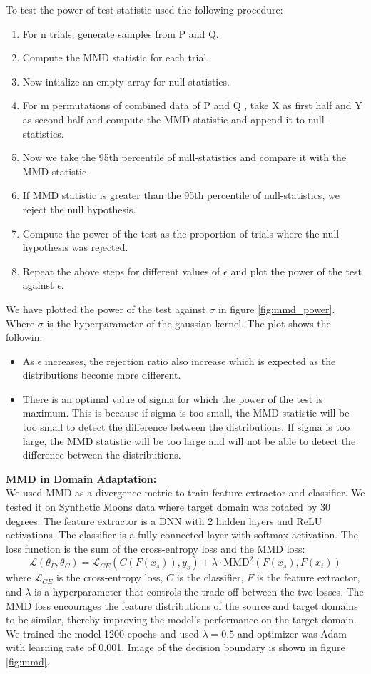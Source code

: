 \documentclass{article}
\begin{document}
To test the power of test statistic used the following procedure:
\begin{enumerate}
  \item For n trials, generate samples from P and Q.
  \item Compute the MMD statistic for each trial.
  \item Now intialize an empty array for null-statistics.
  \item For m permutations of combined data of P and Q , take X as first half and Y as second half and compute the MMD statistic and append it to null-statistics.
  \item Now we take the 95th percentile of null-statistics and compare it with the MMD statistic.
  \item If MMD statistic is greater than the 95th percentile of null-statistics, we reject the null hypothesis.
  \item Compute the power of the test as the proportion of trials where the null hypothesis was rejected.
  \item Repeat the above steps for different values of \(\epsilon\) and plot the power of the test against \(\epsilon\). 
\end{enumerate}
We have plotted the power of the test against \(\sigma\) in figure \ref{fig:mmd_power}. Where \(\sigma\) is the hyperparameter of the gaussian kernel. The plot shows the followin:
\begin{itemize}
  \item As \(\epsilon\) increases, the rejection ratio also increase which is expected as the distributions become more different.
  \item There is an optimal value of sigma for which the power of the test is maximum. This is because if sigma is too small, the MMD statistic will be too small to detect the difference between the distributions. If sigma is too large, the MMD statistic will be too large and will not be able to detect the difference between the distributions.
\end{itemize}

\textbf{MMD in Domain Adaptation:}\\
We used MMD as a divergence metric to train feature extractor and classifier. We tested it on Synthetic Moons data where target domain was rotated by 30 degrees. The feature extractor is a DNN with 2 hidden layers and ReLU activations. The classifier is a fully connected layer with softmax activation. The loss function is the sum of the cross-entropy loss and the MMD loss:
\[
  \mathcal{L}(\theta_F, \theta_C) = \mathcal{L}_{CE}(C(F(x_s)), y_s) + \lambda \cdot \text{MMD}^2(F(x_s), F(x_t))
\]
where \(\mathcal{L}_{CE}\) is the cross-entropy loss, \(C\) is the classifier, \(F\) is the feature extractor, and \(\lambda\) is a hyperparameter that controls the trade-off between the two losses. The MMD loss encourages the feature distributions of the source and target domains to be similar, thereby improving the model's performance on the target domain.
We trained the model 1200 epochs and used \(\lambda = 0.5\) and optimizer was Adam with learning rate of 0.001. Image of the decision boundary is shown in figure \ref{fig:mmd}.
\end{document}

